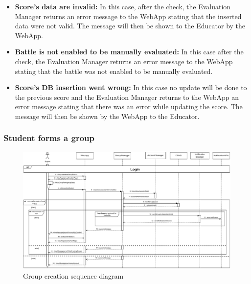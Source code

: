 \documentclass{article}
\begin{document}
{\begin{itemize}
            \item \textbf{Score's data are invalid:} In this case, after the check, 
            the Evaluation Manager returns an error message to the 
            WebApp stating that the inserted data were not valid. The message will 
            then be shown to the Educator by the WebApp.
            \item \textbf{Battle is not enabled to be manually evaluated:} In this case after 
            the check, the Evaluation Manager returns an error message to the WebApp
            stating that the battle was not enabled to be manually evaluated.
            \item \textbf{Score's DB insertion went wrong:} In this case no update will
            be done to the previous score and the Evaluation Manager returns to the WebApp
            an error message stating that there was an 
            error while updating the score. The message will then be shown by the 
            WebApp to the Educator.
        \end{itemize}


    \subsubsection{Student forms a group}
        \begin{figure}[H]
            \centering
            \hspace*{-3.1cm}\includegraphics[scale=0.6]{Sequence/Sequence9DD.pdf}
            \caption{Group creation sequence diagram}
            \label{fig:Sequence9DD}
        \end{figure}

}
\end{document}
